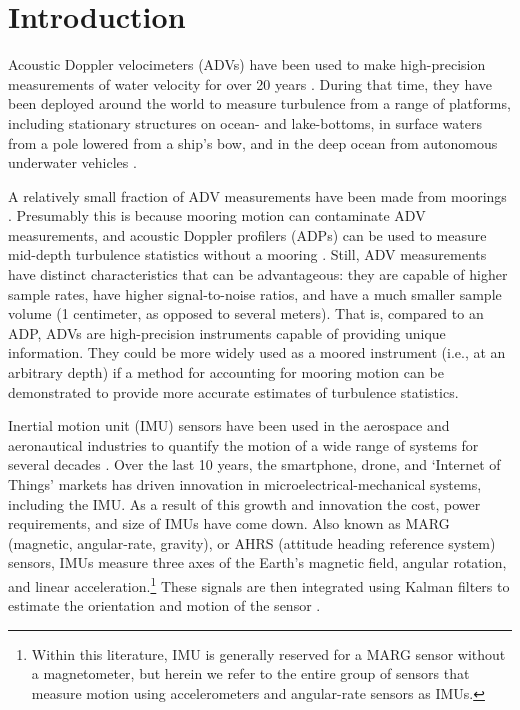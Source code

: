 
\section{Introduction}

Acoustic Doppler velocimeters (ADVs) have been used to make high-precision measurements of water velocity for over 20 years \cite[]{Kraus++1994, Lohrmann++1995}.  During that time, they have been deployed around the world to measure turbulence from a range of platforms, including stationary structures on ocean- and lake-bottoms, in surface waters from a pole lowered from a ship's bow, and in the deep ocean from autonomous underwater vehicles \cite[e.g.,][]{Voulgaris+Trowbridge1998, Zhang++2001, Kim++2000, Goodman++2006, Lorke2007, Geyer++2008, Cartwright++2009}. 


A relatively small fraction of ADV measurements have been made from moorings \cite[e.g.,][]{Fer+Paskyabi2014}. Presumably this is because mooring motion can contaminate ADV measurements, and acoustic Doppler profilers (ADPs) can be used to measure mid-depth turbulence statistics without a mooring \cite[e.g.,][]{Stacey++1999a, Rippeth++2002, Wiles++2006}. Still, ADV measurements have distinct characteristics that can be advantageous: they are capable of higher sample rates, have higher signal-to-noise ratios, and have a much smaller sample volume (1 centimeter, as opposed to several meters). That is, compared to an ADP, ADVs are high-precision instruments capable of providing unique information. They could be more widely used as a moored instrument (i.e., at an arbitrary depth) if a method for accounting for mooring motion can be demonstrated to provide more accurate estimates of turbulence statistics.

Inertial motion unit (IMU) sensors have been used in the aerospace and aeronautical industries to quantify the motion of a wide range of systems for several decades \cite[]{Bevly2004}. Over the last 10 years, the smartphone, drone, and `Internet of Things' markets has driven innovation in microelectrical-mechanical systems, including the IMU. As a result of this growth and innovation the cost, power requirements, and size of IMUs have come down. Also known as MARG (magnetic, angular-rate, gravity), or AHRS (attitude heading reference system) sensors, IMUs measure three axes of the Earth's magnetic field, angular rotation, and linear acceleration.\footnote{Within this literature, IMU is generally reserved for a MARG sensor without a magnetometer, but herein we refer to the entire group of sensors that measure motion using accelerometers and angular-rate sensors as IMUs.} These signals are then integrated using Kalman filters to estimate the orientation and motion of the sensor \cite[]{Barshan+Whyte1995, Marins++2001, Bachmann++2003}.

